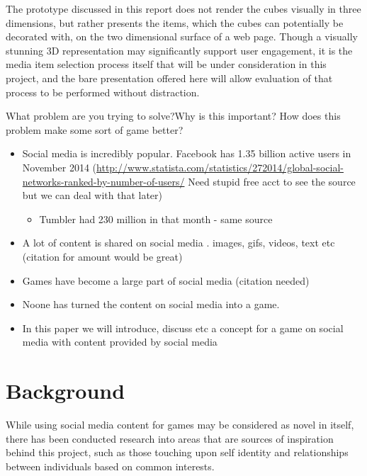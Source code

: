 \documentclass[]{article}
\begin{document}
The prototype discussed in this report does not render the cubes visually in three dimensions, but rather presents the items, which the cubes can potentially be decorated with, on the two dimensional surface of a web page.  Though a visually stunning 3D representation may significantly support user engagement, it is the media item selection process itself that will be under consideration in this project, and the bare presentation offered here will allow evaluation of that process to be performed without distraction.


\begin{framed}
What problem are you trying to solve?Why is this important? How does this problem make some sort of game better?
\end{framed}

\begin{itemize}
\item Social media is incredibly popular. Facebook has 1.35 billion active users in November 2014 (\url{http://www.statista.com/statistics/272014/global-social-networks-ranked-by-number-of-users/} Need stupid free acct to see the source but we can deal with that later)
	\begin{itemize}
	\item Tumbler had 230 million in that month - same source
	\end{itemize}
\item A lot of content is shared on social media . images, gifs, videos, text etc (citation for amount would be great)
\item Games have become a large part of social media (citation needed)
\item Noone has turned the content on social media into a game.
\item In this paper we will introduce, discuss etc a concept for a game on social media with content provided by social media
\end{itemize}



\section{Background}
\label{sec:Background}

While using social media content for games may be considered as novel in itself, there has been conducted research into areas that are sources of inspiration behind this project, such as those touching upon self identity and relationships between individuals based on common interests.
\end{document}
